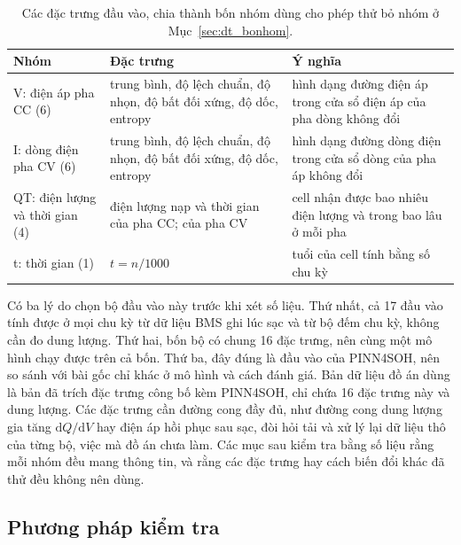 \begin{table}[!htbp]\centering\small
\caption[Các đặc trưng đầu vào]{Các đặc trưng đầu vào, chia thành bốn nhóm dùng cho phép thử bỏ nhóm ở
Mục~\ref{sec:dt_bonhom}.}\label{tab:features}
\begin{tabularx}{\textwidth}{>{\raggedright}p{3.0cm}>{\raggedright}p{5.4cm}>{\raggedright\arraybackslash}X}
\toprule
Nhóm & Đặc trưng & Ý nghĩa \\
\midrule
V: điện áp pha CC (6) & trung bình, độ lệch chuẩn, độ nhọn, độ bất đối xứng, độ dốc, entropy & hình dạng đường điện áp trong
cửa sổ điện áp của pha dòng không đổi \\
I: dòng điện pha CV (6) & trung bình, độ lệch chuẩn, độ nhọn, độ bất đối xứng, độ dốc, entropy & hình dạng đường dòng điện trong
cửa sổ dòng của pha áp không đổi \\
QT: điện lượng và thời gian (4) & điện lượng nạp và thời gian của pha CC; của pha CV & cell nhận được bao nhiêu điện
lượng và trong bao lâu ở mỗi pha \\
t: thời gian (1) & $t = n/1000$ & tuổi của cell tính bằng số chu kỳ \\
\bottomrule
\end{tabularx}
\end{table}

Có ba lý do chọn bộ đầu vào này trước khi xét số liệu. Thứ nhất, cả 17 đầu vào tính được ở mọi chu kỳ từ dữ liệu BMS ghi
lúc sạc và từ bộ đếm chu kỳ, không cần đo dung lượng. Thứ hai, bốn bộ có chung 16 đặc trưng, nên cùng một mô hình chạy
được trên cả bốn. Thứ ba, đây đúng là đầu vào của PINN4SOH, nên so sánh với bài gốc chỉ khác ở mô hình và cách đánh giá.
Bản dữ liệu đồ án dùng là bản đã trích đặc trưng công bố kèm PINN4SOH, chỉ chứa 16 đặc trưng này và dung lượng. Các đặc
trưng cần đường cong đầy đủ, như đường cong dung lượng gia tăng $\mathrm{d}Q/\mathrm{d}V$ hay điện áp hồi phục sau sạc, đòi
hỏi tải và xử lý lại dữ liệu thô của từng bộ, việc mà đồ án chưa làm. Các mục sau kiểm tra bằng số liệu rằng mỗi nhóm
đều mang thông tin, và rằng các đặc trưng hay cách biến đổi khác đã thử đều không nên dùng.

\subsection{Phương pháp kiểm tra}\label{sec:dt_pp}


